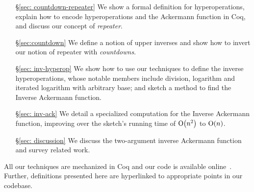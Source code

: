 \begin{itemize}
	\item[\S\ref{sec: countdown-repeater}] We show a formal definition for hyperoperations, explain how to encode hyperoperations and the Ackermann function in Coq, and discuss our concept of \emph{repeater}.
	\item[\S\ref{sec:countdown}] We define a notion of upper inverses and show how to invert our notion of repeater with \emph{countdowns}.
	\item[\S\ref{sec: inv-hyperop}] We show how to use our techniques to define the inverse hyperoperations, whose notable members include division, logarithm and iterated logarithm with arbitrary base; and sketch a method to find the Inverse Ackermann function.
	\item[\S\ref{sec: inv-ack}] We detail a specialized computation for the Inverse Ackermann function, improving over the sketch's running time of $\text{O}\big(n^2\big)$ to $\text{O}(n)$.
	\item[\S\ref{sec: discussion}] We discuss the two-argument inverse Ackermann function and survey related work.
\end{itemize}
All our techniques are mechanized in Coq and our code is available 
online~\cite{inv-ack}. Further, definitions presented here 
are {\color{cyan}hyperlinked} to appropriate points in our codebase.

